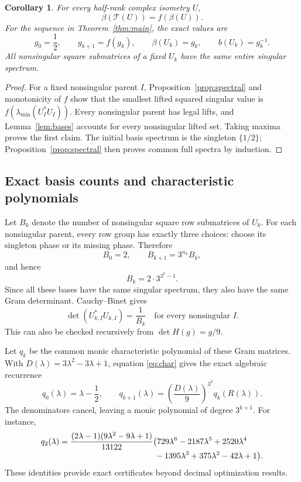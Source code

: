 \documentclass[11pt,letterpaper]{article}
\newtheorem{corollary}[theorem]{Corollary}
\theoremstyle{definition}
\theoremstyle{remark}
\newcommand{\T}{\mathcal T}
\begin{document}
\begin{corollary}\label{cor:exactbeta}
For every half-rank complex isometry $U$,
\[
 \beta(\T(U))=f(\beta(U)).
\]
For the sequence in Theorem~\ref{thm:main}, the exact values are
\begin{equation}
 g_0=\frac12,\qquad g_{k+1}=f(g_k),\qquad
 \beta(U_k)=g_k,\qquad b(U_k)=g_k^{-1}.
 \label{eq:scalarrec}
\end{equation}
All nonsingular square submatrices of a fixed $U_k$ have the same entire singular spectrum.
\end{corollary}
\begin{proof}
For a fixed nonsingular parent $I$, Proposition~\ref{prop:spectral} and monotonicity of $f$ show that the smallest lifted squared singular value is $f(\lambda_{\min}(U_I^*U_I))$. Every nonsingular parent has legal lifts, and Lemma~\ref{lem:bases} accounts for every nonsingular lifted set. Taking maxima proves the first claim. The initial basis spectrum is the singleton $\{1/2\}$; Proposition~\ref{prop:spectral} then proves common full spectra by induction.
\end{proof}

\subsection{Exact basis counts and characteristic polynomials}

Let $B_k$ denote the number of nonsingular square row submatrices of $U_k$. For each nonsingular parent, every row group has exactly three choices: choose its singleton phase or its missing phase. Therefore
\[
 B_0=2,\qquad B_{k+1}=3^{n_k}B_k,
\]
and hence
\begin{equation}
 B_k=2\cdot3^{3^k-1}.
 \label{eq:basiscount}
\end{equation}
Since all these bases have the same singular spectrum, they also have the same Gram determinant. Cauchy--Binet gives
\begin{equation}
 \det(U_{k,I}^*U_{k,I})=\frac1{B_k}
 \quad\text{for every nonsingular }I.
 \label{eq:detbasis}
\end{equation}
This can also be checked recursively from $\det H(g)=g/9$.

Let $q_k$ be the common monic characteristic polynomial of these Gram matrices. With $D(\lambda)=3\lambda^2-3\lambda+1$, equation \eqref{eq:char} gives the exact algebraic recurrence
\begin{equation}
 q_0(\lambda)=\lambda-\frac12,
 \qquad
 q_{k+1}(\lambda)=
 \left(\frac{D(\lambda)}9\right)^{3^k}q_k(R(\lambda)).
 \label{eq:qrec}
\end{equation}
The denominators cancel, leaving a monic polynomial of degree $3^{k+1}$. For instance,
\begin{align}
 q_2(\lambda)&=\frac{(2\lambda-1)(9\lambda^2-9\lambda+1)}{13122}
 \bigl(729\lambda^6-2187\lambda^5+2520\lambda^4\notag\\[-2pt]
 &\hspace{41mm}{}-1395\lambda^3+375\lambda^2-42\lambda+1\bigr).
 \label{eq:q2}
\end{align}
These identities provide exact certificates beyond decimal optimization results.
\end{document}
